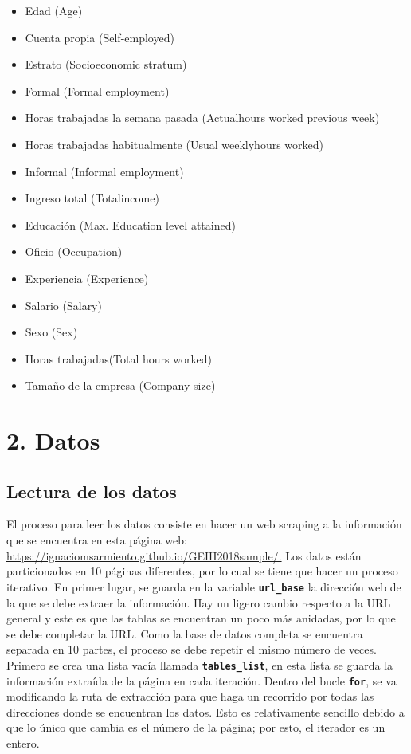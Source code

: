 \documentclass[
]{article}
\providecommand{\tightlist}{%
  \setlength{\itemsep}{0pt}\setlength{\parskip}{0pt}}
\begin{document}
\begin{itemize}
\tightlist
\item
  Edad (Age)
\item
  Cuenta propia (Self-employed)
\item
  Estrato (Socioeconomic stratum)
\item
  Formal (Formal employment)
\item
  Horas trabajadas la semana pasada (Actualhours worked previous week)
\item
  Horas trabajadas habitualmente (Usual weeklyhours worked)
\item
  Informal (Informal employment)
\item
  Ingreso total (Totalincome)
\item
  Educación (Max. Education level attained)
\item
  Oficio (Occupation)
\item
  Experiencia (Experience)
\item
  Salario (Salary)
\item
  Sexo (Sex)
\item
  Horas trabajadas(Total hours worked)
\item
  Tamaño de la empresa (Company size)
\end{itemize}

\hypertarget{datos}{%
\section{2. Datos}\label{datos}}

\hypertarget{lectura-de-los-datos}{%
\subsection{Lectura de los datos}\label{lectura-de-los-datos}}

El proceso para leer los datos consiste en hacer un web scraping a la
información que se encuentra en esta página web:
\url{https://ignaciomsarmiento.github.io/GEIH2018sample/.} Los datos
están particionados en 10 páginas diferentes, por lo cual se tiene que
hacer un proceso iterativo. En primer lugar, se guarda en la variable
\textbf{\texttt{url\_base}} la dirección web de la que se debe extraer
la información. Hay un ligero cambio respecto a la URL general y este es
que las tablas se encuentran un poco más anidadas, por lo que se debe
completar la URL. Como la base de datos completa se encuentra separada
en 10 partes, el proceso se debe repetir el mismo número de veces.
Primero se crea una lista vacía llamada \textbf{\texttt{tables\_list}},
en esta lista se guarda la información extraída de la página en cada
iteración. Dentro del bucle \textbf{\texttt{for}}, se va modificando la
ruta de extracción para que haga un recorrido por todas las direcciones
donde se encuentran los datos. Esto es relativamente sencillo debido a
que lo único que cambia es el número de la página; por esto, el iterador
es un entero.
\end{document}
